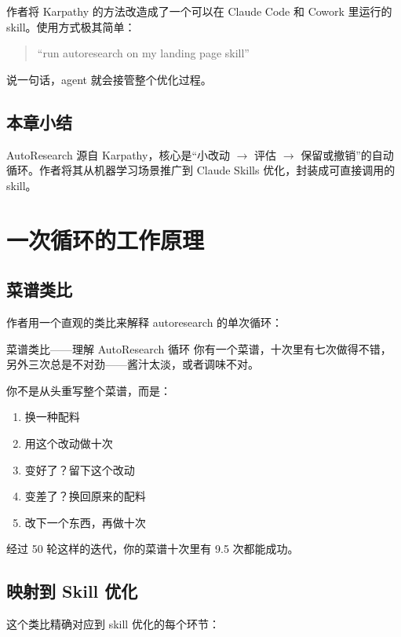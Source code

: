 \documentclass[a4paper]{article}
\begin{document}
作者将 Karpathy 的方法改造成了一个可以在 Claude Code 和 Cowork 里运行的 skill。使用方式极其简单：

\begin{quote}
``run autoresearch on my landing page skill''
\end{quote}

说一句话，agent 就会接管整个优化过程。

\subsection{本章小结}

AutoResearch 源自 Karpathy，核心是``小改动 $\to$ 评估 $\to$ 保留或撤销''的自动循环。作者将其从机器学习场景推广到 Claude Skills 优化，封装成可直接调用的 skill。

\section{一次循环的工作原理}

\subsection{菜谱类比}

作者用一个直观的类比来解释 autoresearch 的单次循环：

\begin{knowledgebox}{菜谱类比——理解 AutoResearch 循环}
你有一个菜谱，十次里有七次做得不错，另外三次总是不对劲——酱汁太淡，或者调味不对。

你不是从头重写整个菜谱，而是：
\begin{enumerate}
    \item 换一种配料
    \item 用这个改动做十次
    \item 变好了？留下这个改动
    \item 变差了？换回原来的配料
    \item 改下一个东西，再做十次
\end{enumerate}

经过 50 轮这样的迭代，你的菜谱十次里有 9.5 次都能成功。
\end{knowledgebox}

\subsection{映射到 Skill 优化}

这个类比精确对应到 skill 优化的每个环节：
\end{document}
